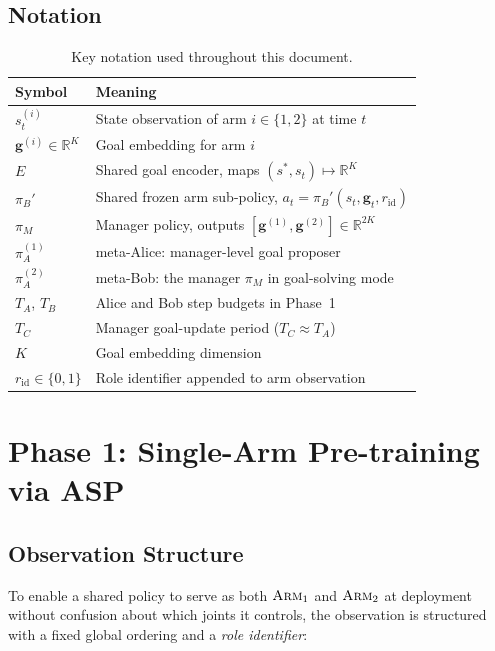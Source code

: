 \documentclass[12pt, a4paper]{article}
\newcommand{\piA}{\pi_A}
\newcommand{\piB}{\pi_B}
\newcommand{\piM}{\pi_M}
\newcommand{\Enc}{E}
\newcommand{\goalvec}{\mathbf{g}}
\newcommand{\RR}{\mathbb{R}}
\newcommand{\arm}[1]{\textsc{Arm}_{#1}}
\begin{document}
\subsection{Notation}
\label{subsec:notation}

\begin{table}[h!]
\centering
\caption{Key notation used throughout this document.}
\begin{tabular}{ll}
\toprule
Symbol & Meaning \\
\midrule
$s_t^{(i)}$ & State observation of arm $i \in \{1,2\}$ at time $t$ \\
$\goalvec^{(i)} \in \RR^K$ & Goal embedding for arm $i$ \\
$\Enc$ & Shared goal encoder, maps $(s^*, s_t) \mapsto \RR^K$ \\
$\piB'$ & Shared frozen arm sub-policy, $a_t = \piB'(s_t, \goalvec_t, r_{\mathrm{id}})$ \\
$\piM$ & Manager policy, outputs $[\goalvec^{(1)}, \goalvec^{(2)}] \in \RR^{2K}$ \\
$\piA^{(1)}$ & meta-Alice: manager-level goal proposer \\
$\piA^{(2)}$ & meta-Bob: the manager $\piM$ in goal-solving mode \\
$T_A$, $T_B$ & Alice and Bob step budgets in Phase~1 \\
$T_C$ & Manager goal-update period ($T_C \approx T_A$) \\
$K$ & Goal embedding dimension \\
$r_{\mathrm{id}} \in \{0,1\}$ & Role identifier appended to arm observation \\
\bottomrule
\end{tabular}
\label{tab:notation}
\end{table}

\section{Phase 1: Single-Arm Pre-training via ASP}
\label{sec:phase1}

\subsection{Observation Structure}
\label{subsec:obs_phase1}

To enable a shared policy to serve as both $\arm{1}$ and $\arm{2}$ at deployment without
confusion about which joints it controls, the observation is structured with a fixed global
ordering and a \emph{role identifier}:
\end{document}
